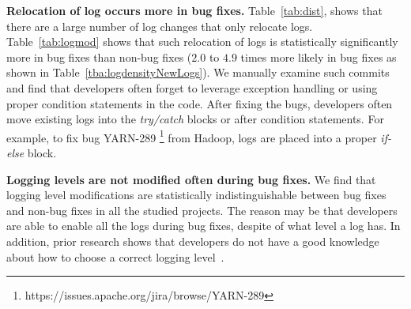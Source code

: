 
\textbf{Relocation of log occurs more in bug fixes.} Table~\ref{tab:dist}, shows that there are a large number of log changes that only relocate logs. Table~\ref{tab:logmod} shows that such relocation of logs is statistically significantly more in bug fixes than non-bug fixes ($2.0$ to $4.9$ times more likely in bug fixes as shown in Table~\ref{tba:logdensityNewLogs}). We manually examine such commits and find that developers often forget to leverage exception handling or using proper condition statements in the code. After fixing the bugs, developers often move existing logs into the \emph{try/catch} blocks or after condition statements. For example, to fix bug YARN-289 \footnote{https://issues.apache.org/jira/browse/YARN-289} from Hadoop, logs are placed into a proper \emph{if-else} block.

\textbf{Logging levels are not modified often during bug fixes.} We find that logging level modifications are statistically indistinguishable between bug fixes and non-bug fixes in all the studied projects. The reason may be that developers are able to enable all the logs during bug fixes, despite of what level a log has. In addition, prior research shows that developers do not have a good knowledge about how to choose a correct logging level~\cite{Characterizinglogs}. 



